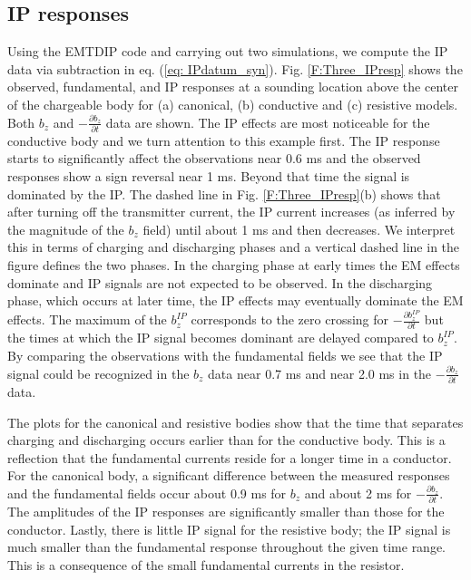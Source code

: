 \documentclass[extra,mreferee]{gji}
\begin{document}
\subsection{IP responses}
Using the  EMTDIP code and carrying out two simulations, we compute the IP data via subtraction in eq. (\ref{eq: IPdatum_syn}).
Fig. \ref{F:Three_IPresp} shows the observed, fundamental, and IP responses at a sounding location above the center of the chargeable body for (a) canonical, (b) conductive and (c) resistive models. Both $b_z$ and $-\frac{\partial b_z}{\partial t}$ data are shown.
The IP effects are most noticeable for the conductive body and we turn attention to this example first. The IP response starts to significantly affect the observations near 0.6 ms and the observed responses show a sign reversal near 1 ms. Beyond that time the signal is dominated by the IP. The dashed line in Fig. \ref{F:Three_IPresp}(b) shows that after turning off the transmitter current, the IP current increases (as inferred by the magnitude of the $b_z$ field) until about 1 ms and then decreases. We interpret this in terms of charging and discharging phases and a vertical dashed line in the figure defines the two phases. In the charging phase at early times the EM effects dominate and IP signals are not expected to be observed. In the discharging phase, which occurs at  later time, the IP effects may eventually dominate the EM effects. The maximum of the $b_z^{IP}$ corresponds to the zero crossing for $-\frac{\partial b_z^{IP}}{\partial t}$ but the times at which the IP signal becomes dominant are delayed compared to $b_z^{IP}$. By comparing the observations with the fundamental fields we see that the IP signal could be recognized in the $b_z$ data near 0.7 ms and near 2.0 ms in the $-\frac{\partial b_z}{\partial t}$ data.

The plots for the canonical and resistive bodies show that the time that separates charging and discharging occurs earlier than for the conductive body. This is a reflection that the fundamental currents reside for a longer time in a conductor. For the canonical body, a significant difference between the measured responses and the fundamental fields occur about 0.9 ms for $b_z$ and about 2 ms for $-\frac{\partial b_z}{\partial t}$. The amplitudes of the IP responses are significantly smaller than those for the conductor.  Lastly, there is little IP signal for the resistive body; the IP signal is much smaller than the fundamental response throughout the given time range. This is a consequence of the small fundamental currents in the resistor.
\end{document}
